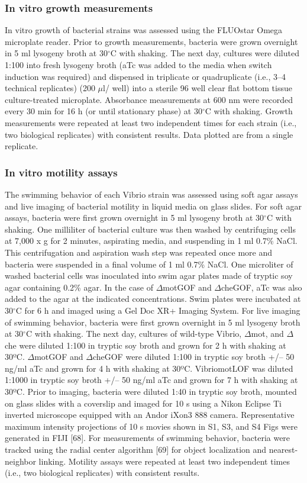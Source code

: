 \subsubsection{In vitro growth measurements}
In vitro growth of bacterial strains was assessed using the FLUOstar Omega microplate reader. Prior to growth measurements, bacteria were grown overnight in 5 ml lysogeny broth at 30$^\circ$C with shaking. The next day, cultures were diluted 1:100 into fresh lysogeny broth (aTc was added to the media when switch induction was required) and dispensed in triplicate or quadruplicate (i.e., 3–4 technical replicates) (200 $\mu$l/ well) into a sterile 96 well clear flat bottom tissue culture-treated microplate. Absorbance measurements at 600 nm were recorded every 30 min for 16 h (or until stationary phase) at 30$^\circ$C with shaking. Growth measurements were repeated at least two independent times for each strain (i.e., two biological replicates) with consistent results. Data plotted are from a single replicate.

\subsubsection{In vitro motility assays}
The swimming behavior of each Vibrio strain was assessed using soft agar assays and live imaging of bacterial motility in liquid media on glass slides. For soft agar assays, bacteria were first grown overnight in 5 ml lysogeny broth at 30$^\circ$C with shaking. One milliliter of bacterial culture was then washed by centrifuging cells at 7,000 x g for 2 minutes, aspirating media, and suspending in 1 ml 0.7\% NaCl. This centrifugation and aspiration wash step was repeated once more and bacteria were suspended in a final volume of 1 ml 0.7\% NaCl. One microliter of washed bacterial cells was inoculated into swim agar plates made of tryptic soy agar containing 0.2\% agar. In the case of $\Delta$motGOF and $\Delta$cheGOF, aTc was also added to the agar at the indicated concentrations. Swim plates were incubated at 30$^\circ$C for 6 h and imaged using a Gel Doc XR+ Imaging System. For live imaging of swimming behavior, bacteria were first grown overnight in 5 ml lysogeny broth at 30$^\circ$C with shaking. The next day, cultures of wild-type Vibrio, $\Delta$mot, and $\Delta$che were diluted 1:100 in tryptic soy broth and grown for 2 h with shaking at 30ºC. $\Delta$motGOF and $\Delta$cheGOF were diluted 1:100 in tryptic soy broth +/– 50 ng/ml aTc and grown for 4 h with shaking at 30ºC. VibriomotLOF was diluted 1:1000 in tryptic soy broth +/– 50 ng/ml aTc and grown for 7 h with shaking at 30ºC. Prior to imaging, bacteria were diluted 1:40 in tryptic soy broth, mounted on glass slides with a coverslip and imaged for 10 s using a Nikon Eclipse Ti inverted microscope equipped with an Andor iXon3 888 camera. Representative maximum intensity projections of 10 s movies shown in S1, S3, and S4 Figs were generated in FIJI [68]. For measurements of swimming behavior, bacteria were tracked using the radial center algorithm [69] for object localization and nearest-neighbor linking. Motility assays were repeated at least two independent times (i.e., two biological replicates) with consistent results. 

